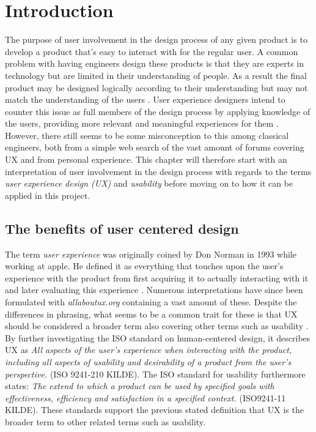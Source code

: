 \chapter{Introduction}
\label{Introduction}
The purpose of user involvement in the design process of any given product is to develop a product that's easy to interact with for the regular user. A common problem with having engineers design these products is that they are experts in technology but are limited in their understanding of people. As a result the final product may be designed logically according to their understanding but may not match the understanding of the users \parencite[][6]{PDF:DonNorman}. User experience designers intend to counter this issue as full members of the design process by applying knowledge of the users, providing more relevant and meaningful experiences for them \parencite{WEB:UXDesign}. However, there still seems to be some misconception to this among classical engineers, both from a simple web search of the vast amount of forums covering UX and from personal experience. This chapter will therefore start with an interpretation of user involvement in the design process with regards to the terms \textit{user experience design (UX)} and \textit{usability} before moving on to how it can be applied in this project.

\section{The benefits of user centered design}
\label{UXbenefits}
The term \textit{user experience} was originally coined by Don Norman in 1993 while working at apple. He defined it as everything that touches upon the user's experience with the product from first acquiring it to actually interacting with it and later evaluating this experience \parencite{WEB:DonNormanOnUX}. Numerous interpretations have since been formulated with \textit{allaboutux.org} containing a vast amount of these. Despite the differences in phrasing, what seems to be a common trait for these is that UX should be considered a broader term also covering other terms such as usability \parencite{WEB:UXDefinitions}. By further investigating the ISO standard on human-centered design, it describes UX as \textit{All aspects of the user's experience when interacting with the product, including all aspects of usability and desirability of a product from the user's perspective.} (ISO 9241-210 KILDE). The ISO standard for usability furthermore states: \textit{The extend to which a product can be used by specified goals with effectiveness, efficiency and satisfaction in a specified context.} (ISO9241-11 KILDE). These standards support the previous stated definition that UX is the broader term to other related terms such as usability.\\


